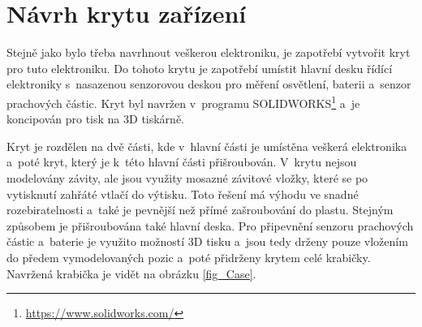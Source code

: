 \chapter{Návrh krytu zařízení}

Stejně jako bylo třeba navrhnout veškerou elektroniku, je zapotřebí vytvořit kryt pro tuto elektroniku. Do tohoto krytu je zapotřebí umístit hlavní desku řídící elektroniky s~nasazenou senzorovou deskou pro měření osvětlení, baterii a~senzor prachových částic. Kryt byl navržen v~programu SOLIDWORKS\footnote{\url{https://www.solidworks.com/}} a~je koncipován pro tisk na 3D tiskárně. 

Kryt je rozdělen na dvě části, kde v~hlavní části je umístěna veškerá elektronika a~poté kryt, který je k~této hlavní části přišroubován. V~krytu nejsou modelovány závity, ale jsou využity mosazné závitové vložky, které se po vytisknutí zahřáté vtlačí do výtisku. Toto řešení má výhodu ve snadné rozebiratelnosti a~také je pevnější než přímé zašroubování do plastu. Stejným způsobem je přišroubována také hlavní deska. Pro připevnění senzoru prachových částic a~baterie je využito možností 3D tisku a~jsou tedy drženy pouze vložením do předem vymodelovaných pozic a~poté přidrženy krytem celé krabičky. Navržená krabička je vidět na obrázku \ref{fig_Case}.

